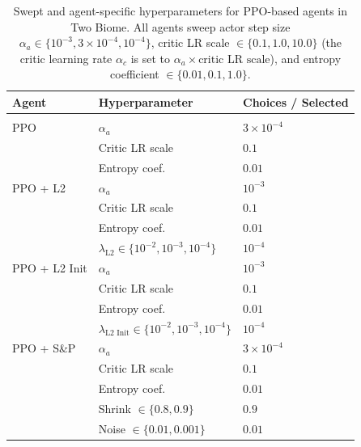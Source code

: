 \begin{table}[H]
    \caption{Swept and agent-specific hyperparameters for PPO-based agents in Two Biome. All agents sweep actor step size $\alpha_a \in \{10^{-3}, 3 \times 10^{-4}, 10^{-4}\}$, critic LR scale $\in \{0.1, 1.0, 10.0\}$ (the critic learning rate $\alpha_c$ is set to $\alpha_a \times \text{critic LR scale}$), and entropy coefficient $\in \{0.01, 0.1, 1.0\}$.}
    \begin{center}
        \begin{tabular}{lll}
            \multicolumn{1}{l}{\bf Agent} & \multicolumn{1}{l}{\bf Hyperparameter} & \multicolumn{1}{l}{\bf Choices / Selected}
            \\ \hline \\
            PPO                  & $\alpha_a$      & $3 \times 10^{-4}$ \\
                                 & Critic LR scale & $0.1$ \\
                                 & Entropy coef.   & $0.01$ \\[4pt]
            PPO + L2             & $\alpha_a$      & $10^{-3}$ \\
                                 & Critic LR scale & $0.1$ \\
                                 & Entropy coef.   & $0.01$ \\
                                 & $\lambda_{\text{L2}} \in \{10^{-2}, 10^{-3}, 10^{-4}\}$ & $10^{-4}$ \\[4pt]
            PPO + L2 Init        & $\alpha_a$      & $10^{-3}$ \\
                                 & Critic LR scale & $0.1$ \\
                                 & Entropy coef.   & $0.01$ \\
                                 & $\lambda_{\text{L2 Init}} \in \{10^{-2}, 10^{-3}, 10^{-4}\}$ & $10^{-4}$ \\[4pt]
            PPO + S\&P           & $\alpha_a$      & $3 \times 10^{-4}$ \\
                                 & Critic LR scale & $0.1$ \\
                                 & Entropy coef.   & $0.01$ \\
                                 & Shrink $\in \{0.8, 0.9\}$   & $0.9$ \\
                                 & Noise $\in \{0.01, 0.001\}$ & $0.01$ \\

\end{tabular}
\end{center}
\end{table}
